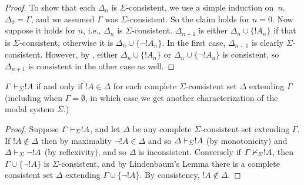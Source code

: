 \documentclass[../../../include/open-logic-section]{subfiles}
\begin{document}
\begin{proof}
To show that each $\Delta_n$ is $\Sigma$-consistent, we use a simple
induction on~$n$. $\Delta_0 = \Gamma$, and we assumed $\Gamma$ was
$\Sigma$-consistent. So the claim holds for $n = 0$. Now suppose it
holds for $n$, i.e., $\Delta_n$ is $\Sigma$-consistent. $\Delta_{n+1}$
is either $\Delta_n \cup \{!A_n\}$ if that is $\Sigma$-consistent,
otherwise it is $\Delta_n \cup \{\lnot!A_n\}$. In the first case,
$\Delta_{n+1}$ is clearly $\Sigma$-consistent. However, by
,
either $\Delta_n \cup \{!A_n\}$ or $\Delta_n \cup \{\lnot!A_n\}$ is
consistent, so $\Delta_{n+1}$ is consistent in the other case as well.
\end{proof}

\begin{cor}
  $\Gamma \Proves[\Sigma] !A$ if and only if $!A \in \Delta$ for
  each  complete $\Sigma$-consistent set $\Delta$ extending $\Gamma$
  (including when $\Gamma = \emptyset$, in which case we get another
  characterization of the modal system $\Sigma$.)
\end{cor}

\begin{proof}
  Suppose $\Gamma \Proves[\Sigma] !A$, and let $\Delta$ be any
  complete $\Sigma$-consistent set extending $\Gamma$. If $!A
  \notin \Delta$ then by maximality $\lnot!A \in \Delta$ and so
  $\Delta \Proves[\Sigma] !A$ (by monotonicity) and $\Delta
  \Proves[\Sigma] \lnot!A$ (by reflexivity), and so $\Delta$ is
  inconsistent. Conversely if $\Gamma \Proves/[\Sigma] !A$, then
  $\Gamma \cup \{ \lnot!A\}$ is $\Sigma$-consistent, and by
  Lindenbaum's Lemma there is a complete consistent set $\Delta$
  extending $\Gamma \cup \{ \lnot!A \}$. By consistency, $!A
  \notin \Delta$.
\end{proof}
\end{document}
